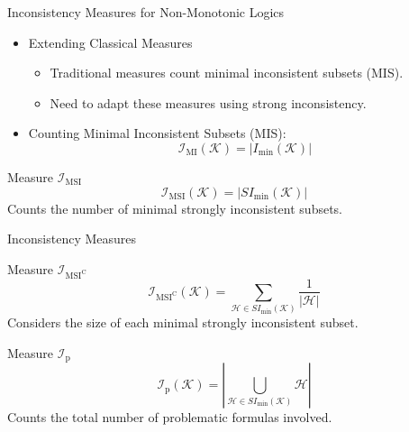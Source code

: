 \begin{frame}{Inconsistency Measures for Non-Monotonic Logics}
    \begin{itemize}
        \item Extending Classical Measures
              \begin{itemize}
                  \item Traditional measures count minimal inconsistent subsets (MIS).
                  \item Need to adapt these measures using strong inconsistency.
              \end{itemize}
        \item Counting Minimal Inconsistent Subsets (MIS):
              \[
                  \mathcal{I}_{\text{MI}}(\mathcal{K}) = \left| I_{\min}(\mathcal{K}) \right|
              \]
    \end{itemize}
    \begin{block}{Measure \( \mathcal{I}_{\text{MSI}} \)}
        \[
            \mathcal{I}_{\text{MSI}}(\mathcal{K}) = \left| SI_{\min}(\mathcal{K}) \right|
        \]
        Counts the number of minimal strongly inconsistent subsets.
    \end{block}
\end{frame}

\begin{frame}{Inconsistency Measures}
    \begin{block}{Measure \( \mathcal{I}_{\text{MSI}^\text{C}} \)}
        \[
            \mathcal{I}_{\text{MSI}^\text{C}}(\mathcal{K}) = \sum\limits_{\mathcal{H} \in SI_{\min}(\mathcal{K})} \frac{1}{|\mathcal{H}|}
        \]
        Considers the size of each minimal strongly inconsistent subset.
    \end{block}
    \begin{block}{Measure \( \mathcal{I}_{\text{p}} \)}
        \[
            \mathcal{I}_{\text{p}}(\mathcal{K}) = \left| \bigcup\limits_{\mathcal{H} \in SI_{\min}(\mathcal{K})} \mathcal{H} \right|
        \]
        Counts the total number of problematic formulas involved.
    \end{block}
\end{frame}

